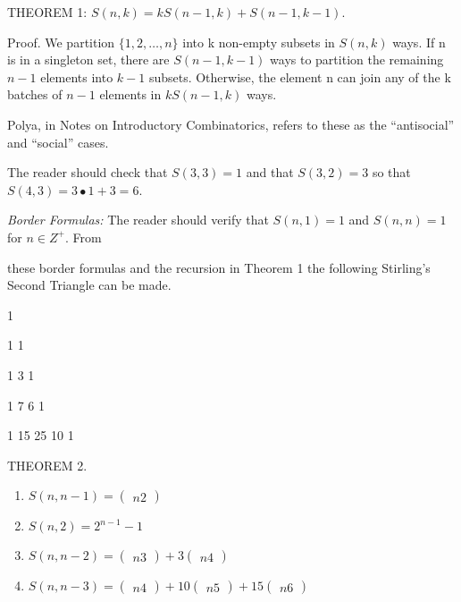 \documentclass[10pt,letter]{article}
\begin{document}
THEOREM 1:
\(S\left( n,k \right) = kS\left( n - 1,k \right) + S(n - 1,k - 1)\).

Proof. We partition \(\{ 1,2,\ldots,n\}\) into k non-empty subsets in
\(S(n,k)\) ways. If n is in a singleton set, there are
\(S(n - 1,k - 1)\) ways to partition the remaining \(n - 1\) elements
into \(k - 1\) subsets. Otherwise, the element n can join any of the k
batches of \(n - 1\) elements in \(kS(n - 1,k)\) ways.

Polya, in Notes on Introductory Combinatorics, refers to these as the
``antisocial'' and ``social'' cases.

The reader should check that \(S\left( 3,3 \right) = 1\) and that
\(S\left( 3,2 \right) = 3\) so that
\(S\left( 4,3 \right) = 3 \bullet 1 + 3 = 6\).

\emph{Border Formulas:} The reader should verify that
\(S\left( n,1 \right) = 1\) and \(S\left( n,n \right) = 1\) for
\(n \in Z^{+}\). From

these border formulas and the recursion in Theorem 1 the following
Stirling's Second Triangle can be made.

1

1 1

1 3 1

1 7 6 1

1 15 25 10 1

THEOREM 2.
\begin{enumerate}
\def\labelenumi{(\alph{enumi})}

\item
  \(S\left( n,n - 1 \right) =\begin{pmatrix}
  n
  2
  \end{pmatrix}
\)
\item
  \(S\left( n,2 \right) = 2^{n - 1} - 1\)
\item
  \(S\left( n,n - 2 \right) =\begin{pmatrix}
  n
  3
  \end{pmatrix}
 + 3\begin{pmatrix}
  n
  4
  \end{pmatrix}
\)
\item
  \(S\left( n,n - 3 \right) =\begin{pmatrix}
  n
  4
  \end{pmatrix}
 + 10\begin{pmatrix}
  n
  5
  \end{pmatrix}
 + 15\begin{pmatrix}
  n
  6
  \end{pmatrix}
\)

\end{enumerate}
\end{document}
